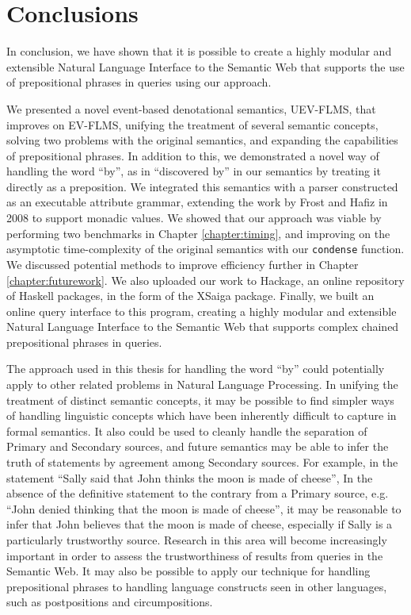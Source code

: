 \documentclass[../main.tex]{subfiles}
\begin{document}
\chapter{Conclusions}

In conclusion, we have shown that it is possible to create a highly modular and extensible Natural Language Interface to the Semantic Web that supports the use of prepositional phrases in queries using our approach.

We presented a novel event-based denotational semantics, UEV-FLMS, that improves on EV-FLMS, unifying
the treatment of several semantic concepts, solving two problems with the original semantics, and expanding the capabilities of prepositional phrases.
In addition to this, we demonstrated a novel way of handling the word ``by'', as in ``discovered by'' in our semantics by treating it directly as a preposition.
We integrated this semantics with a parser constructed as an executable attribute grammar, extending the work by Frost and Hafiz in 2008\cite{frosthafiz2008} to support
monadic values.  We showed that our approach was viable by performing two benchmarks in Chapter \ref{chapter:timing}, and improving on the asymptotic time-complexity of the original semantics with our \texttt{condense} function.  We discussed potential methods to improve efficiency further in Chapter \ref{chapter:futurework}.  We also uploaded our work to Hackage, an online repository of Haskell packages, in the form of the XSaiga package.  Finally, we built an online query interface to this program, creating a highly modular and extensible Natural Language Interface to the Semantic Web that supports complex chained prepositional phrases in queries.

The approach used in this thesis for handling the word ``by'' could potentially apply to other related problems in Natural Language Processing.
In unifying the treatment of distinct semantic concepts, it may be possible to find simpler ways of handling linguistic concepts which have been inherently difficult
to capture in formal semantics.  It also could be used to cleanly handle the separation of Primary and Secondary sources, and future semantics may be able to infer
the truth of statements by agreement among Secondary sources.  For example, in the statement ``Sally said that John thinks the moon is made of cheese'',
In the absence of the definitive statement to the contrary from a Primary source, e.g. ``John denied thinking that the moon is made of cheese'', it may be reasonable
to infer that John believes that the moon is made of cheese, especially if Sally is a particularly trustworthy source.  Research in this area will
become increasingly important in order to assess the trustworthiness of results from queries in the Semantic Web.  It may also be possible to apply our technique
for handling prepositional phrases to handling language constructs seen in other languages, such as postpositions and circumpositions.
\end{document}
